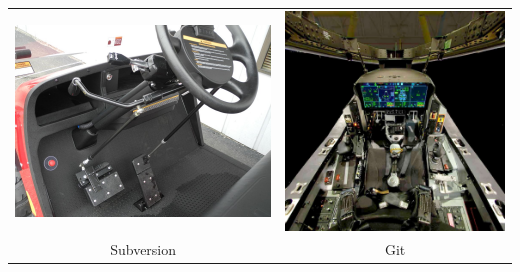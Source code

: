 \documentclass{beamer}
\begin{document}
\begin{frame}
\begin{tabular}{cc}
  \includegraphics[height=0.4\textheight]{golfcart.jpg}
  &
  \includegraphics[height=0.5\textheight]{f35.jpg}
   \\
   Subversion&Git
 \end{tabular}
\end{frame}
\end{document}
